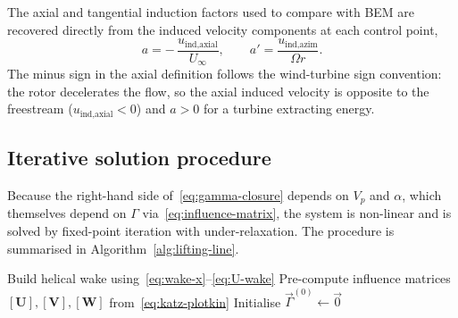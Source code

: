 The axial and tangential induction factors used to compare with BEM are recovered directly from the induced velocity components at each control point,
\begin{equation}
a = -\,\frac{u_{\text{ind,axial}}}{U_\infty},
\qquad
a' = \frac{u_{\text{ind,azim}}}{\Omega r}.
\label{eq:induction-factors}
\end{equation}
The minus sign in the axial definition follows the wind-turbine sign convention: the rotor decelerates the flow, so the axial induced velocity is opposite to the freestream ($u_{\text{ind,axial}}<0$) and $a>0$ for a turbine extracting energy.

\subsection{Iterative solution procedure}
\label{sec:iteration}

Because the right-hand side of~\eqref{eq:gamma-closure} depends on $V_p$ and $\alpha$, which themselves depend on $\Gamma$ via~\eqref{eq:influence-matrix}, the system is non-linear and is solved by fixed-point iteration with under-relaxation. The procedure is summarised in Algorithm~\ref{alg:lifting-line}.

\begin{algorithm}[H]
\SetAlgoLined
{}
Build helical wake using~\eqref{eq:wake-x}--\eqref{eq:U-wake}\;
Pre-compute influence matrices $[\mathbf{U}],[\mathbf{V}],[\mathbf{W}]$ from~\eqref{eq:katz-plotkin}\;
Initialise $\vec{\Gamma}^{(0)} \leftarrow \vec{0}$\;
\caption{Frozen-wake lifting line iteration.}
\label{alg:lifting-line}
\end{algorithm}

